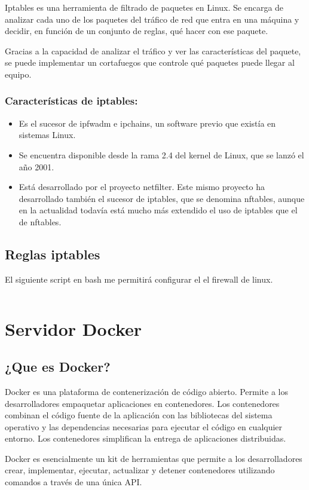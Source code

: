 			Iptables es una herramienta de filtrado de paquetes en Linux. Se encarga de analizar cada uno de los paquetes del tráfico de red que entra en una máquina y decidir, en función de un conjunto de reglas, qué hacer con ese paquete.
			
			Gracias a la capacidad de analizar el tráfico y ver las características del paquete, se puede implementar un cortafuegos que controle qué paquetes puede llegar al equipo.
			
			\subsubsection{Características de iptables:}
			
				\begin{itemize}
					\item Es el sucesor de ipfwadm e ipchains, un software previo que existía en sistemas Linux.
				
					\item Se encuentra disponible desde la rama 2.4 del kernel de Linux, que se lanzó el año 2001.
				
					\item Está desarrollado por el proyecto netfilter. Este mismo proyecto ha desarrollado también el sucesor de iptables, que se denomina nftables, aunque en la actualidad todavía está mucho más extendido el uso de iptables que el de nftables.
					
				\end{itemize}		
			
			\subsection{Reglas iptables}
			
				El siguiente script en bash me permitirá configurar el el firewall de linux.
			
				\inputminted{bash}{documentos/firewall/firewall.sh}
	
			
	\section{Servidor Docker}
	
		\subsection{¿Que es Docker?}
			Docker es una plataforma de contenerización de código abierto. Permite a los desarrolladores empaquetar aplicaciones en contenedores. Los contenedores combinan el código fuente de la aplicación con las bibliotecas del sistema operativo y las dependencias necesarias para ejecutar el código en cualquier entorno. Los contenedores simplifican la entrega de aplicaciones distribuidas.\par
			Docker es esencialmente un kit de herramientas que permite a los desarrolladores crear, implementar, ejecutar, actualizar y detener contenedores utilizando comandos a través de una única API.
			
